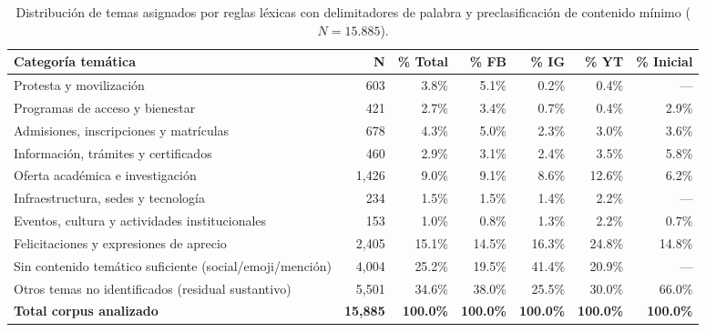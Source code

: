
\begin{table}[htbp]
\centering
\small
\caption{Distribución de temas asignados por reglas léxicas con delimitadores de palabra y preclasificación de contenido mínimo ($N = 15.885$).}
\label{tab:temas_actualizados}
\begin{tabular}{lrrrrrr}
\toprule
\textbf{Categoría temática} & \textbf{N} & \textbf{\% Total} & \textbf{\% FB} & \textbf{\% IG} & \textbf{\% YT} & \textbf{\% Inicial} \\
\midrule
Protesta y movilización & 603 & 3.8\% & 5.1\% & 0.2\% & 0.4\% & — \\
Programas de acceso y bienestar & 421 & 2.7\% & 3.4\% & 0.7\% & 0.4\% & 2.9\% \\
Admisiones, inscripciones y matrículas & 678 & 4.3\% & 5.0\% & 2.3\% & 3.0\% & 3.6\% \\
Información, trámites y certificados & 460 & 2.9\% & 3.1\% & 2.4\% & 3.5\% & 5.8\% \\
Oferta académica e investigación & 1,426 & 9.0\% & 9.1\% & 8.6\% & 12.6\% & 6.2\% \\
Infraestructura, sedes y tecnología & 234 & 1.5\% & 1.5\% & 1.4\% & 2.2\% & — \\
Eventos, cultura y actividades institucionales & 153 & 1.0\% & 0.8\% & 1.3\% & 2.2\% & 0.7\% \\
Felicitaciones y expresiones de aprecio & 2,405 & 15.1\% & 14.5\% & 16.3\% & 24.8\% & 14.8\% \\
\midrule
Sin contenido temático suficiente (social/emoji/mención) & 4,004 & 25.2\% & 19.5\% & 41.4\% & 20.9\% & — \\
Otros temas no identificados (residual sustantivo) & 5,501 & 34.6\% & 38.0\% & 25.5\% & 30.0\% & 66.0\% \\
\midrule
\textbf{Total corpus analizado} & \textbf{15,885} & \textbf{100.0\%} & \textbf{100.0\%} & \textbf{100.0\%} & \textbf{100.0\%} & \textbf{100.0\%} \\
\bottomrule
\end{tabular}
\end{table}

